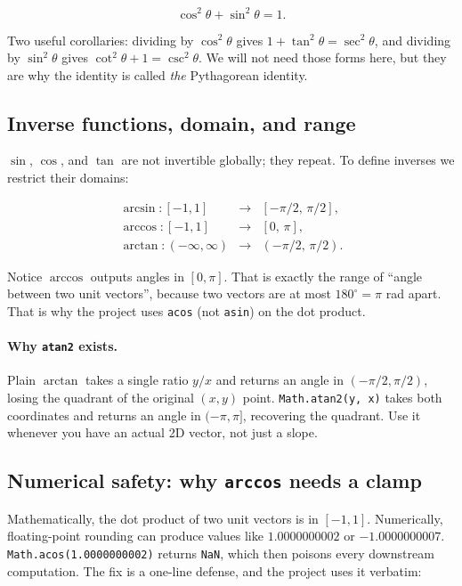 \documentclass{article}
\begin{document}
\[
  \cos^2\theta + \sin^2\theta = 1.
\]

Two useful corollaries: dividing by $\cos^2\theta$ gives
$1 + \tan^2\theta = \sec^2\theta$, and dividing by $\sin^2\theta$ gives
$\cot^2\theta + 1 = \csc^2\theta$. We will not need those forms here, but they
are why the identity is called \emph{the} Pythagorean identity.

\subsection{Inverse functions, domain, and range}

$\sin$, $\cos$, and $\tan$ are not invertible globally; they repeat. To define
inverses we restrict their domains:

\[
\begin{array}{lll}
  \arcsin : [-1, 1] & \to & [-\pi/2,\, \pi/2], \\[3pt]
  \arccos : [-1, 1] & \to & [0,\, \pi], \\[3pt]
  \arctan : (-\infty, \infty) & \to & (-\pi/2,\, \pi/2).
\end{array}
\]

Notice $\arccos$ outputs angles in $[0, \pi]$. That is exactly the range of
``angle between two unit vectors'', because two vectors are at most
$180^\circ = \pi$ rad apart. That is why the project uses \lstinline{acos}
(not \lstinline{asin}) on the dot product.

\paragraph{Why \lstinline{atan2} exists.} Plain $\arctan$ takes a single ratio
$y/x$ and returns an angle in $(-\pi/2, \pi/2)$, losing the quadrant of the
original $(x,y)$ point. \lstinline{Math.atan2(y, x)} takes both coordinates and
returns an angle in $(-\pi, \pi]$, recovering the quadrant. Use it whenever you
have an actual 2D vector, not just a slope.

\subsection{Numerical safety: why \lstinline{arccos} needs a clamp}

Mathematically, the dot product of two unit vectors is in $[-1, 1]$. Numerically,
floating-point rounding can produce values like $1.0000000002$ or
$-1.0000000007$. \lstinline{Math.acos(1.0000000002)} returns \lstinline{NaN},
which then poisons every downstream computation. The fix is a one-line
defense, and the project uses it verbatim:
\end{document}
